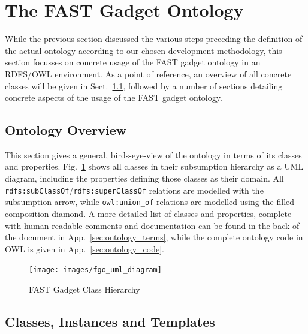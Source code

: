 \documentclass[twoside]{fast_latex}
\begin{document}
%
%
%
\clearpage
\section{The FAST Gadget Ontology} %
\label{sec:ontology}

While the previous section discussed the various steps preceding the definition of the actual ontology according to our chosen development methodology, this section focusses on concrete usage of the FAST gadget ontology in an RDFS/OWL environment. As a point of reference, an overview of all concrete classes will be given in Sect.~\ref{sub:ontology_overview}, followed by a number of sections detailing concrete aspects of the usage of the FAST gadget ontology.

\subsection{Ontology Overview} %
\label{sub:ontology_overview}

This section gives a general, birds-eye-view of the ontology in terms of its classes and properties. Fig.~\ref{fig:ontology_uml} shows all classes in their subsumption hierarchy as a UML diagram, including the properties defining those classes as their domain. All \texttt{rdfs:subClassOf}/\texttt{rdfs:superClassOf} relations are modelled with the subsumption arrow, while \texttt{owl:union\_of} relations are modelled using the filled composition diamond.
A more detailed list of classes and properties, complete with human-readable comments and documentation can be found in the back of the document in App.~\ref{sec:ontology_terms}, while the complete ontology code in OWL is given in App.~\ref{sec:ontology_code}.

\begin{figure}
  \begin{center}
    \texttt{[image: images/fgo\_uml\_diagram]}
    \caption{FAST Gadget Class Hierarchy}
    \label{fig:ontology_uml}
  \end{center}
\end{figure}



\subsection{Classes, Instances and Templates} %
\label{sub:classes_instances_and_templates}
\end{document}
